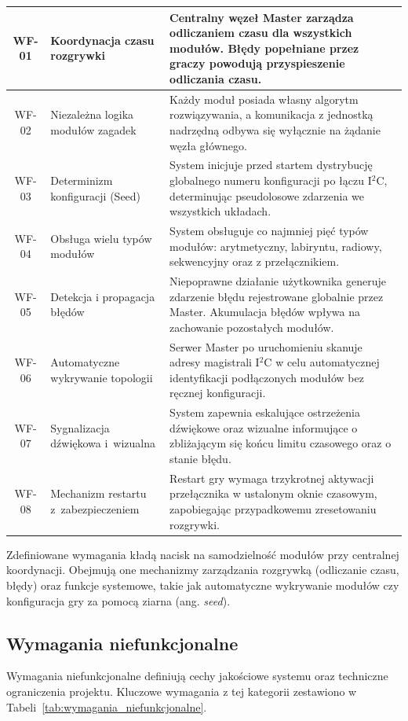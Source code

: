 \documentclass{SGGW-thesis}
\begin{document}
\begin{longtable}{|c|p{3.8cm}|p{8.2cm}|}
  WF-01          & Koordynacja czasu rozgrywki          & Centralny węzeł Master zarządza odliczaniem czasu dla wszystkich modułów. Błędy popełniane przez graczy powodują przyspieszenie odliczania czasu.         \\
  \hline
  WF-02          & Niezależna logika modułów zagadek    & Każdy moduł posiada własny algorytm rozwiązywania, a komunikacja z jednostką nadrzędną odbywa się wyłącznie na żądanie węzła głównego.       \\
  \hline
  WF-03          & Determinizm konfiguracji (Seed)      & System inicjuje przed startem dystrybucję globalnego numeru konfiguracji po łączu I$^2$C, determinując pseudolosowe zdarzenia we wszystkich układach.   \\
  \hline
  WF-04          & Obsługa wielu typów modułów          & System obsługuje co najmniej pięć typów modułów: arytmetyczny, labiryntu, radiowy, sekwencyjny oraz z przełącznikiem.                                     \\
  \hline
  WF-05          & Detekcja i propagacja błędów         & Niepoprawne działanie użytkownika generuje zdarzenie błędu rejestrowane globalnie przez Master. Akumulacja błędów wpływa na zachowanie pozostałych modułów. \\
  \hline
  WF-06          & Automatyczne wykrywanie topologii    & Serwer Master po uruchomieniu skanuje adresy magistrali I$^2$C w celu automatycznej identyfikacji podłączonych modułów bez ręcznej konfiguracji.          \\
  \hline
  WF-07          & Sygnalizacja dźwiękowa i~wizualna    & System zapewnia eskalujące ostrzeżenia dźwiękowe oraz wizualne informujące o zbliżającym się końcu limitu czasowego oraz o stanie błędu.                  \\
  \hline
  WF-08          & Mechanizm restartu z~zabezpieczeniem & Restart gry wymaga trzykrotnej aktywacji przełącznika w ustalonym oknie czasowym, zapobiegając przypadkowemu zresetowaniu rozgrywki.                      \\
  \hline
\end{longtable}

Zdefiniowane wymagania kładą nacisk na samodzielność modułów przy centralnej koordynacji. Obejmują one mechanizmy zarządzania rozgrywką (odliczanie czasu, błędy) oraz funkcje systemowe, takie jak automatyczne wykrywanie modułów czy konfiguracja gry za pomocą ziarna (ang. \textit{seed}).

\subsection{Wymagania niefunkcjonalne}
Wymagania niefunkcjonalne definiują cechy jakościowe systemu oraz techniczne ograniczenia projektu. Kluczowe wymagania z tej kategorii zestawiono w Tabeli~\ref{tab:wymagania_niefunkcjonalne}.
\end{document}
